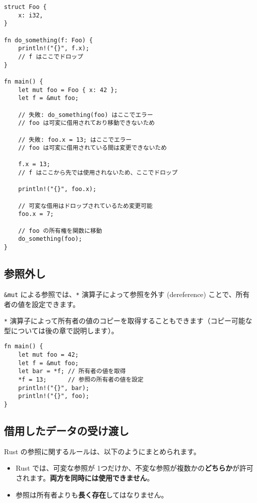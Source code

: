 \begin{verbatim}
struct Foo {
    x: i32,
}

fn do_something(f: Foo) {
    println!("{}", f.x);
    // f はここでドロップ
}

fn main() {
    let mut foo = Foo { x: 42 };
    let f = &mut foo;

    // 失敗: do_something(foo) はここでエラー
    // foo は可変に借用されており移動できないため

    // 失敗: foo.x = 13; はここでエラー
    // foo は可変に借用されている間は変更できないため

    f.x = 13;
    // f はここから先では使用されないため、ここでドロップ

    println!("{}", foo.x);

    // 可変な借用はドロップされているため変更可能
    foo.x = 7;

    // foo の所有権を関数に移動
    do_something(foo);
}
\end{verbatim}

\subsection{参照外し}

\texttt{\&mut} による参照では、\texttt{*} 演算子によって参照を外す
(dereference) ことで、所有者の値を設定できます。

\texttt{*}
演算子によって所有者の値のコピーを取得することもできます（コピー可能な型については後の章で説明します）。

\begin{verbatim}
fn main() {
    let mut foo = 42;
    let f = &mut foo;
    let bar = *f; // 所有者の値を取得
    *f = 13;      // 参照の所有者の値を設定
    println!("{}", bar);
    println!("{}", foo);
}
\end{verbatim}

\subsection{借用したデータの受け渡し}

Rust の参照に関するルールは、以下のようにまとめられます。

\begin{itemize}
\item
  Rust では、可変な参照が
  1つだけか、不変な参照が複数かの\textbf{どちらか}が許可されます。\textbf{両方を同時には使用できません}。
\item
  参照は所有者よりも\textbf{長く存在}してはなりません。
\end{itemize}

